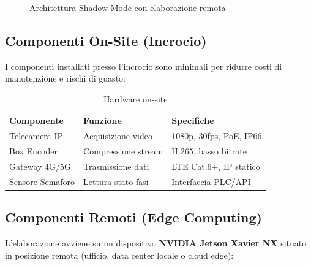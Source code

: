 \documentclass[a4paper,11pt]{article}
\begin{document}
\begin{figure}[H]
    \caption{Architettura Shadow Mode con elaborazione remota}
\end{figure}

\subsection{Componenti On-Site (Incrocio)}

I componenti installati presso l'incrocio sono minimali per ridurre costi di manutenzione e rischi di guasto:

\begin{table}[H]
    \centering
    \begin{tabular}{lll}
        \toprule
        \textbf{Componente} & \textbf{Funzione} & \textbf{Specifiche} \\
        \midrule
        Telecamera IP & Acquisizione video & 1080p, 30fps, PoE, IP66 \\
        Box Encoder & Compressione stream & H.265, basso bitrate \\
        Gateway 4G/5G & Trasmissione dati & LTE Cat.6+, IP statico \\
        Sensore Semaforo & Lettura stato fasi & Interfaccia PLC/API \\
        \bottomrule
    \end{tabular}
    \caption{Hardware on-site}
\end{table}

\subsection{Componenti Remoti (Edge Computing)}

L'elaborazione avviene su un dispositivo \textbf{NVIDIA Jetson Xavier NX} situato in posizione remota (ufficio, data center locale o cloud edge):
\end{document}
